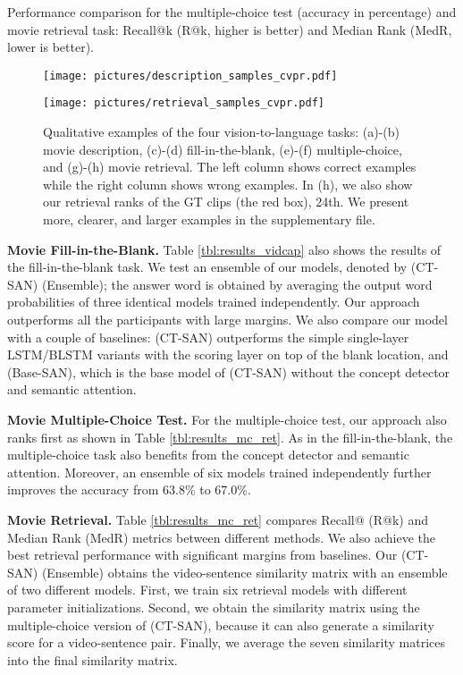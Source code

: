 \documentclass[10pt,twocolumn,letterpaper]{article}
\theoremstyle{nonumberplain}
\begin{document}
\begin{table}[t!]
\medskip
\caption{
    Performance comparison for the multiple-choice test (accuracy in percentage)
    and movie retrieval task: Recall@k (R@k, higher is better) and Median Rank (MedR, lower is better).
}
\label{tbl:results_mc_ret}
\vspace{-7pt}
\end{table}


\begin{figure*}[t!]
\centering
\texttt{[image: pictures/description\_samples\_cvpr.pdf]}
\vspace{3pt}

\texttt{[image: pictures/retrieval\_samples\_cvpr.pdf]}
\vspace{3pt}
\caption{Qualitative examples of the four vision-to-language tasks:
    (a)-(b) movie description, (c)-(d) fill-in-the-blank, (e)-(f) multiple-choice, and (g)-(h) movie retrieval.
    The left column shows correct examples while the right column shows wrong examples.
    In (h), we also show our retrieval ranks of the GT clips (the red box), 24th.
    We present more, clearer, and larger examples in the supplementary file.
}
\vspace{-3pt}
\label{fig:examples}
\end{figure*}


\textbf{Movie Fill-in-the-Blank.}
Table \ref{tbl:results_vidcap} also shows the results of the fill-in-the-blank task.
We test an ensemble of our models, denoted by (CT-SAN) (Ensemble);
the answer word is obtained by averaging the output word probabilities of three identical models trained independently. Our approach outperforms all the participants with large margins.
We also compare our model with a couple of baselines:
(CT-SAN) outperforms
the simple single-layer LSTM/BLSTM variants with the scoring layer on top of the blank location,
and (Base-SAN), which is the base model of (CT-SAN) without the concept detector and semantic attention.


\textbf{Movie Multiple-Choice Test.}
For the multiple-choice test, our approach also ranks first as shown in Table \ref{tbl:results_mc_ret}.
As in the fill-in-the-blank, the multiple-choice task also benefits from
the concept detector and semantic attention.
Moreover, an ensemble of six models trained independently further improves the accuracy from 63.8\% to 67.0\%. 

\textbf{Movie Retrieval.}
Table \ref{tbl:results_mc_ret} compares Recall@ (R@k) and Median Rank (MedR) metrics between different methods. We also achieve the best retrieval performance with significant margins from baselines.
Our (CT-SAN) (Ensemble) obtains the video-sentence similarity matrix with an ensemble of two different models.
First, we train six retrieval models with different parameter initializations.
Second, we obtain the similarity matrix using the multiple-choice version of (CT-SAN), because it can also generate a similarity score for a video-sentence pair.
Finally, we average the seven similarity matrices into the final similarity matrix.
\end{document}
